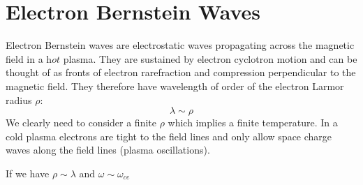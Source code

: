 \section{Electron Bernstein Waves}
Electron Bernstein waves are electrostatic waves propagating across the magnetic field in a $\textit{hot}$ plasma. They are sustained by electron cyclotron motion and can be thought of as fronts of electron rarefraction and compression perpendicular to the magnetic field. They therefore have wavelength of order of the electron Larmor radius $\rho$:
\begin{equation}
	\lambda \sim \rho
\end{equation}
We clearly need to consider a finite $\rho$ which implies a finite temperature. In a cold plasma electrons are tight to the field lines and only allow space charge waves along the field lines (plasma oscillations).

If we have $\rho \sim \lambda$ and $\omega \sim \omega_{ce}$